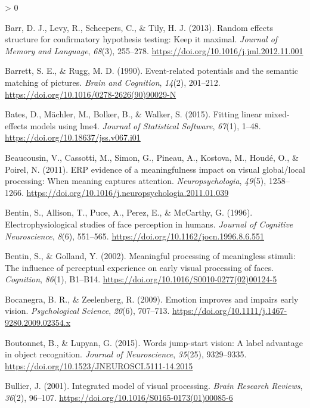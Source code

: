 \documentclass[
  english,
  doc,12pt,twoside,floatsintext]{apa7}
\newlength{\cslhangindent}
\newenvironment{CSLReferences}[2] %
 {%
  \setlength{\parindent}{0pt}
  \ifodd #1 \everypar{\setlength{\hangindent}{\cslhangindent}}\ignorespaces\fi
  \ifnum #2 > 0
  \setlength{\parskip}{#2\baselineskip}
  \fi
 }%
 {}
\begin{document}
\begin{CSLReferences}{1}{0}
\leavevmode\hypertarget{ref-barr2013}{}%
Barr, D. J., Levy, R., Scheepers, C., \& Tily, H. J. (2013). Random effects structure for confirmatory hypothesis testing: Keep it maximal. \emph{Journal of Memory and Language}, \emph{68}(3), 255--278. \url{https://doi.org/10.1016/j.jml.2012.11.001}

\leavevmode\hypertarget{ref-barrett1990}{}%
Barrett, S. E., \& Rugg, M. D. (1990). Event-related potentials and the semantic matching of pictures. \emph{Brain and Cognition}, \emph{14}(2), 201--212. \url{https://doi.org/10.1016/0278-2626(90)90029-N}

\leavevmode\hypertarget{ref-R-lme4}{}%
Bates, D., Mächler, M., Bolker, B., \& Walker, S. (2015). Fitting linear mixed-effects models using {lme4}. \emph{Journal of Statistical Software}, \emph{67}(1), 1--48. \url{https://doi.org/10.18637/jss.v067.i01}

\leavevmode\hypertarget{ref-beaucousin2011}{}%
Beaucousin, V., Cassotti, M., Simon, G., Pineau, A., Kostova, M., Houdé, O., \& Poirel, N. (2011). ERP evidence of a meaningfulness impact on visual global/local processing: When meaning captures attention. \emph{Neuropsychologia}, \emph{49}(5), 1258--1266. \url{https://doi.org/10.1016/j.neuropsychologia.2011.01.039}

\leavevmode\hypertarget{ref-bentin1996}{}%
Bentin, S., Allison, T., Puce, A., Perez, E., \& McCarthy, G. (1996). Electrophysiological studies of face perception in humans. \emph{Journal of Cognitive Neuroscience}, \emph{8}(6), 551--565. \url{https://doi.org/10.1162/jocn.1996.8.6.551}

\leavevmode\hypertarget{ref-bentin2002}{}%
Bentin, S., \& Golland, Y. (2002). Meaningful processing of meaningless stimuli: The influence of perceptual experience on early visual processing of faces. \emph{Cognition}, \emph{86}(1), B1--B14. \url{https://doi.org/10.1016/S0010-0277(02)00124-5}

\leavevmode\hypertarget{ref-bocanegra2009}{}%
Bocanegra, B. R., \& Zeelenberg, R. (2009). Emotion improves and impairs early vision. \emph{Psychological Science}, \emph{20}(6), 707--713. \url{https://doi.org/10.1111/j.1467-9280.2009.02354.x}

\leavevmode\hypertarget{ref-boutonnet2015}{}%
Boutonnet, B., \& Lupyan, G. (2015). Words jump-start vision: A label advantage in object recognition. \emph{Journal of Neuroscience}, \emph{35}(25), 9329--9335. \url{https://doi.org/10.1523/JNEUROSCI.5111-14.2015}

\leavevmode\hypertarget{ref-bullier2001}{}%
Bullier, J. (2001). Integrated model of visual processing. \emph{Brain Research Reviews}, \emph{36}(2), 96--107. \url{https://doi.org/10.1016/S0165-0173(01)00085-6}


\end{CSLReferences}
\end{document}
